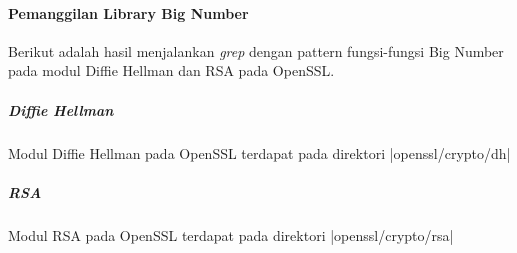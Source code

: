\clearpage
\paragraph{Pemanggilan Library Big Number} \label{sec:bn_func_call}
Berikut adalah hasil menjalankan \textit{grep} dengan pattern fungsi-fungsi Big Number pada modul Diffie Hellman dan RSA pada OpenSSL.

\subparagraph{Diffie Hellman}
Modul Diffie Hellman pada OpenSSL terdapat pada direktori |openssl/crypto/dh|


\subparagraph{RSA}
Modul RSA pada OpenSSL terdapat pada direktori |openssl/crypto/rsa|

